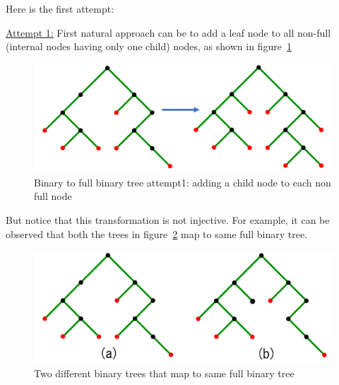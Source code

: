 Here is the first attempt:

\noindent \underline{Attempt 1:} First natural approach can be to add a leaf node to all non-full (internal nodes having only one child) nodes, as shown in figure~\ref{fig:bt-fbt-attempt1}
\begin{figure}[h!]
    \centering
    \includegraphics[width=0.7\linewidth]{images/binary-to-full-binary-1.png}
    \caption{Binary to full binary tree attempt1: adding a child node to each non full node}
    \label{fig:bt-fbt-attempt1}
\end{figure}

But notice that this transformation is not injective. For example, it can be observed that  both the trees in figure~\ref{fig:bt-fbt-attempt1-issue} map to same full binary tree.
\begin{figure}[h!]
    \centering
    \includegraphics[width=0.7\linewidth]{images/binary-to-full-binary-2.png}
    \caption{Two different binary trees that map to same full binary tree}
    \label{fig:bt-fbt-attempt1-issue}
\end{figure}

